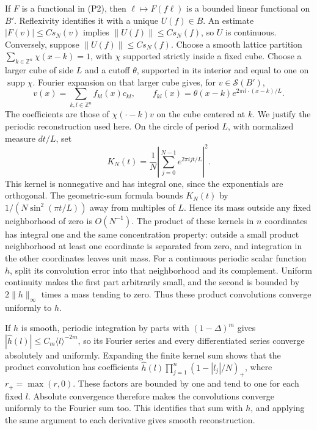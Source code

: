 \documentclass[
  11pt,
]{article}
\begin{document}
If \(F\) is a functional in (P2), then \(\ell\mapsto F(f\ell)\) is a
bounded linear functional on \(B'\). Reflexivity identifies it with a
unique \(U(f)\in B\). An estimate \(|F(v)|\leq Cs_N(v)\) implies
\(\|U(f)\|\leq Cs_N(f)\), so \(U\) is continuous. Conversely, suppose
\(\|U(f)\|\leq Cs_N(f)\). Choose a smooth lattice partition
\(\sum_{k\in\mathbb Z^n}\chi(x-k)=1\), with \(\chi\) supported strictly
inside a fixed cube. Choose a larger cube of side \(L\) and a cutoff
\(\theta\), supported in its interior and equal to one on
\(\operatorname{supp}\chi\). Fourier expansion on that larger cube
gives, for \(v\in\mathcal S(B')\), \[
 v(x)=\sum_{k,l\in\mathbb Z^n}f_{kl}(x)c_{kl},\qquad
 f_{kl}(x)=\theta(x-k)e^{2\pi i l\cdot(x-k)/L}.
\tag{P3}
\] The coefficients are those of \(\chi(\cdot-k)v\) on the cube centered
at \(k\). We justify the periodic reconstruction used here. On the
circle of period \(L\), with normalized measure \(dt/L\), set \[
 K_N(t)=\frac1N\left|\sum_{j=0}^{N-1}e^{2\pi ijt/L}\right|^2.
\] This kernel is nonnegative and has integral one, since the
exponentials are orthogonal. The geometric-sum formula bounds \(K_N(t)\)
by \(1/(N\sin^2(\pi t/L))\) away from multiples of \(L\). Hence its mass
outside any fixed neighborhood of zero is \(O(N^{-1})\). The product of
these kernels in \(n\) coordinates has integral one and the same
concentration property: outside a small product neighborhood at least
one coordinate is separated from zero, and integration in the other
coordinates leaves unit mass. For a continuous periodic scalar function
\(h\), split its convolution error into that neighborhood and its
complement. Uniform continuity makes the first part arbitrarily small,
and the second is bounded by \(2\|h\|_\infty\) times a mass tending to
zero. Thus these product convolutions converge uniformly to \(h\).

If \(h\) is smooth, periodic integration by parts with \((1-\Delta)^m\)
gives \(|\widehat h(l)|\leq C_m\langle l\rangle^{-2m}\), so its Fourier
series and every differentiated series converge absolutely and
uniformly. Expanding the finite kernel sum shows that the product
convolution has coefficients
\(\widehat h(l)\prod_{j=1}^n(1-|l_j|/N)_+\), where \(r_+=\max(r,0)\).
These factors are bounded by one and tend to one for each fixed \(l\).
Absolute convergence therefore makes the convolutions converge uniformly
to the Fourier sum too. This identifies that sum with \(h\), and
applying the same argument to each derivative gives smooth
reconstruction.
\end{document}
